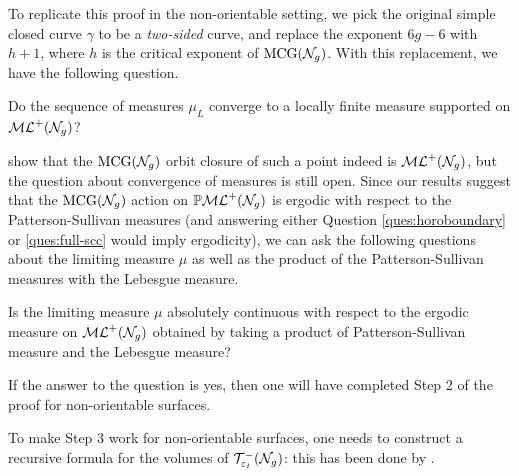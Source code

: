 To replicate this proof in the non-orientable setting, we pick the original simple closed curve $\gamma$ to be a \emph{two-sided} curve, and replace the exponent $6g-6$ with $h + 1$, where $h$ is the critical exponent of $\mathrm{MCG}(\mathcal{N}_g)$.
With this replacement, we have the following question.
\begin{question}
  Do the sequence of measures $\mu_L$ converge to a locally finite measure supported on $\mathcal{ML}^+(\mathcal{N}_g)$?
\end{question}

\textcite{erlandsson2023mapping} show that the $\mathrm{MCG}(\mathcal{N}_g)$ orbit closure of such a point indeed is $\mathcal{ML}^+(\mathcal{N}_g)$, but the question about convergence of measures is still open.
Since our results suggest that the $\mathrm{MCG}(\mathcal{N}_g)$ action on $\mathbb{P}\mathcal{ML}^+(\mathcal{N}_g)$ is ergodic with respect to the Patterson-Sullivan measures (and answering either Question \ref{ques:horoboundary} or \ref{ques:full-scc} would imply ergodicity), we can ask the following questions about the limiting measure $\mu$ as well as the product of the Patterson-Sullivan measures with the Lebesgue measure.

\begin{question}
  Is the limiting measure $\mu$ absolutely continuous with respect to the ergodic measure on $\mathcal{ML}^+(\mathcal{N}_g)$ obtained by taking a product of Patterson-Sullivan measure and the Lebesgue measure?
\end{question}
If the answer to the question is yes, then one will have completed Step 2 of the proof for non-orientable surfaces.

To make Step 3 work for non-orientable surfaces, one needs to construct a recursive formula for the volumes of $\mathcal{T}_{\varepsilon_t}^{-}(\mathcal{N}_g)$: this has been done by \textcite{stanford2023mirzakhani}.



